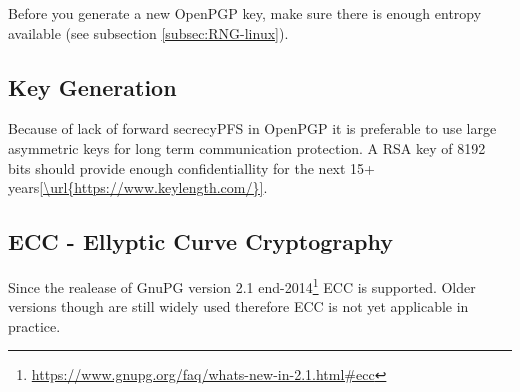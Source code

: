 
Before you generate a new OpenPGP key, make sure there is enough entropy available (see subsection \ref{subsec:RNG-linux}).

\subsection{Key Generation}
Because of lack of forward secrecy\ac{PFS} in OpenPGP it is preferable to use large asymmetric keys for long term communication protection. A RSA key of 8192 bits should provide enough confidentiallity for the next 15+ years\ref{\url{https://www.keylength.com/}}.



\subsection{ECC - Ellyptic Curve Cryptography}
Since the realease of GnuPG version 2.1 end-2014\footnote{\url{https://www.gnupg.org/faq/whats-new-in-2.1.html#ecc}} ECC is supported. Older versions though are still widely used therefore ECC is not yet applicable in practice. 












